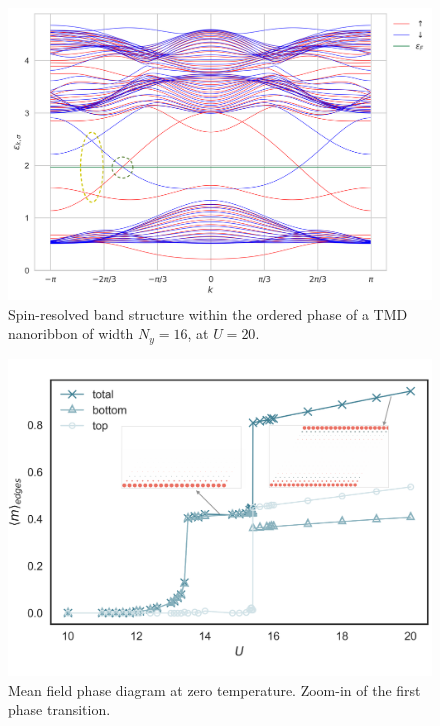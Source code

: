 \begin{figure}[H]
\centering
    \includegraphics[scale = 0.42]{images/bands_Nx=512.png}
  \caption{Spin-resolved band structure within the ordered phase of a TMD nanoribbon of width $N_y = 16$, at $U = 20$.}
  \label{fig:bandsU20}
\end{figure}
\begin{figure}[H]
\includegraphics[trim={0cm 1.7cm 0cm 1.7cm},clip, scale =0.21]{images/edge-mag.pdf}
	\caption[Mean field phase diagram at zero temperature. Zoom-in of the first phase transition.]{Mean field phase diagram at zero temperature. Zoom-in of the first phase transition.
	\label{fig:zeroTphaseDiagram}}
\end{figure}
